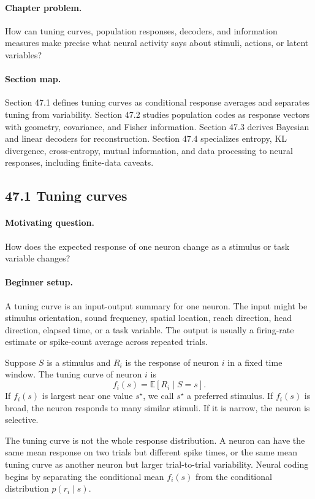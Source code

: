 \paragraph{Chapter problem.}
How can tuning curves, population responses, decoders, and information measures make precise what neural activity says about stimuli, actions, or latent variables?

\paragraph{Section map.}
Section 47.1 defines tuning curves as conditional response averages and separates tuning from variability. Section 47.2 studies population codes as response vectors with geometry, covariance, and Fisher information. Section 47.3 derives Bayesian and linear decoders for reconstruction. Section 47.4 specializes entropy, KL divergence, cross-entropy, mutual information, and data processing to neural responses, including finite-data caveats.

\subsection{47.1 Tuning curves}

\paragraph{Motivating question.}
How does the expected response of one neuron change as a stimulus or task variable changes?

\paragraph{Beginner setup.}
A tuning curve is an input-output summary for one neuron. The input might be stimulus orientation, sound frequency, spatial location, reach direction, head direction, elapsed time, or a task variable. The output is usually a firing-rate estimate or spike-count average across repeated trials.

Suppose \(S\) is a stimulus and \(R_i\) is the response of neuron \(i\) in a fixed time window. The tuning curve of neuron \(i\) is
\[
f_i(s)=\mathbb E[R_i\mid S=s].
\]
If \(f_i(s)\) is largest near one value \(s^\star\), we call \(s^\star\) a preferred stimulus. If \(f_i(s)\) is broad, the neuron responds to many similar stimuli. If it is narrow, the neuron is selective.

The tuning curve is not the whole response distribution. A neuron can have the same mean response on two trials but different spike times, or the same mean tuning curve as another neuron but larger trial-to-trial variability. Neural coding begins by separating the conditional mean \(f_i(s)\) from the conditional distribution \(p(r_i\mid s)\).

